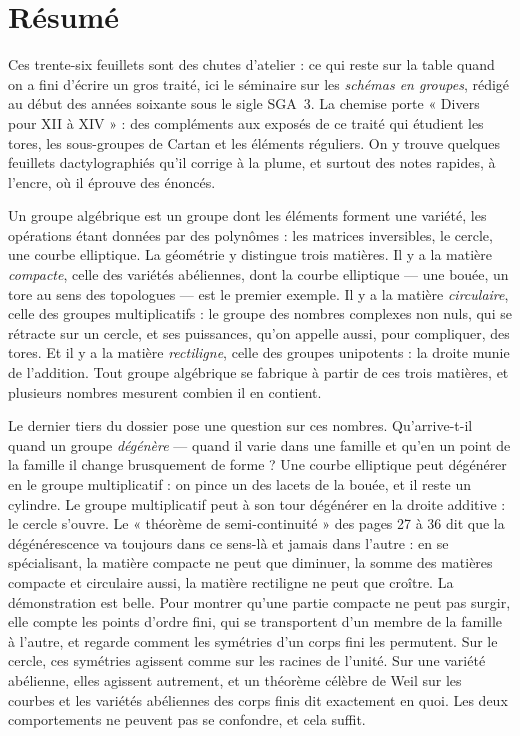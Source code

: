 \documentclass[11pt,a4paper]{article}
\begin{document}
\section*{Résumé}

\begin{resume}
Ces trente-six feuillets sont des chutes d'atelier : ce qui reste sur la table
quand on a fini d'écrire un gros traité, ici le séminaire sur les
\emph{schémas en groupes}, rédigé au début des années soixante sous le sigle
SGA~3. La chemise porte « Divers pour XII à XIV » : des compléments aux
exposés de ce traité qui étudient les tores, les sous-groupes de Cartan et les
éléments réguliers. On y trouve quelques feuillets dactylographiés qu'il
corrige à la plume, et surtout des notes rapides, à l'encre, où il éprouve des
énoncés.

Un groupe algébrique est un groupe dont les éléments forment une variété, les
opérations étant données par des polynômes : les matrices inversibles, le
cercle, une courbe elliptique. La géométrie y distingue trois matières. Il y a
la matière \emph{compacte}, celle des variétés abéliennes, dont la courbe
elliptique --- une bouée, un tore au sens des topologues --- est le premier
exemple. Il y a la matière \emph{circulaire}, celle des groupes
multiplicatifs : le groupe des nombres complexes non nuls, qui se rétracte sur
un cercle, et ses puissances, qu'on appelle aussi, pour compliquer, des tores.
Et il y a la matière \emph{rectiligne}, celle des groupes unipotents : la
droite munie de l'addition. Tout groupe algébrique se fabrique à partir de ces
trois matières, et plusieurs nombres mesurent combien il en contient.

Le dernier tiers du dossier pose une question sur ces nombres. Qu'arrive-t-il
quand un groupe \emph{dégénère} --- quand il varie dans une famille et qu'en
un point de la famille il change brusquement de forme ? Une courbe elliptique
peut dégénérer en le groupe multiplicatif : on pince un des lacets de la
bouée, et il reste un cylindre. Le groupe multiplicatif peut à son tour
dégénérer en la droite additive : le cercle s'ouvre. Le « théorème de
semi-continuité » des pages 27 à 36 dit que la dégénérescence va toujours dans
ce sens-là et jamais dans l'autre : en se spécialisant, la matière compacte ne
peut que diminuer, la somme des matières compacte et circulaire aussi, la
matière rectiligne ne peut que croître. La démonstration est belle. Pour
montrer qu'une partie compacte ne peut pas surgir, elle compte les points
d'ordre fini, qui se transportent d'un membre de la famille à l'autre, et
regarde comment les symétries d'un corps fini les permutent. Sur le cercle,
ces symétries agissent comme sur les racines de l'unité. Sur une variété
abélienne, elles agissent autrement, et un théorème célèbre de Weil sur les
courbes et les variétés abéliennes des corps finis dit exactement en quoi.
Les deux comportements ne peuvent pas se confondre, et cela suffit.


\end{resume}
\end{document}
